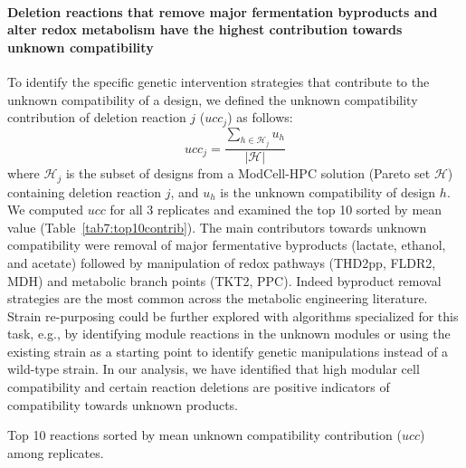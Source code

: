 {\paragraph{Deletion reactions that remove major fermentation byproducts and alter redox metabolism have the highest contribution towards unknown compatibility}

To identify the specific genetic intervention strategies that contribute to
the unknown compatibility of a design,  we defined the unknown compatibility contribution of deletion reaction $j$ ($ucc_j$) as follows:
\begin{equation}
    ucc_j=\frac{\sum\limits_{h\in\mathcal{H}_j} u_h}{|\mathcal{H}|}
\end{equation}
where $\mathcal{H}_j$ is the subset of designs from a ModCell-HPC solution (Pareto set $\mathcal{H}$) containing deletion reaction $j$, and $u_h$ is the unknown compatibility of design $h$.
We computed $ucc$ for all 3 replicates and examined the top 10 sorted by mean value (Table~\ref{tab7:top10contrib}).
The main contributors towards unknown compatibility were removal of major fermentative byproducts (lactate, ethanol, and acetate) followed by manipulation of redox pathways (THD2pp, FLDR2, MDH) and metabolic branch points (TKT2, PPC).
Indeed byproduct removal strategies are the most common across the metabolic engineering literature.\citep{winkler2015}
Strain re-purposing could be further explored with algorithms specialized for this task, e.g., by identifying module reactions in the unknown modules or using the existing strain as a starting point to identify genetic manipulations instead of a wild-type strain.
In our analysis, we have identified that high modular cell compatibility and certain reaction deletions are positive indicators of compatibility towards unknown products.

\begin{table}[h]
    \caption{Top 10 reactions sorted by mean unknown compatibility contribution ($ucc$) among replicates. }
    \centering
    
    \label{tab7:top10contrib}
\end{table}

}

